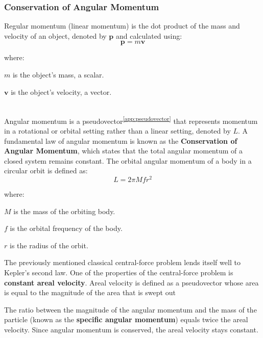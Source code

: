 \documentclass[12pt]{article}
\newcommand{\sref}[1]{\textsuperscript{\ref{#1}}}
\begin{document}
\begin{spacing}{1.25}
\subsubsection{Conservation of Angular Momentum}
\par {
    Regular momentum (linear momentum) is the dot product of the mass and velocity of an object, denoted by \(\mathbf{p}\) and calculated using:
    \begin{equation*}
        \mathbf{p} = m\mathbf{v}
    \end{equation*}
    
    \noindent where:
    \begin{slist}
        \item \(m\) is the object's mass, a scalar.
        \item \(\mathbf{v}\) is the object's velocity, a vector.
    \end{slist}
    
    \hfill \\
    Angular momentum is a pseudovector\sref{app:pseudovector} that represents momentum in a rotational or orbital setting rather than a linear setting, denoted by \(L\). A fundamental law of angular momentum is known as the \textbf{Conservation of Angular Momentum}, which states that the total angular momentum of a closed system remains constant. The orbital angular momentum of a body in a circular orbit is defined as:
    \begin{equation}
        L = 2\pi Mfr^2
    \end{equation}

    \noindent where:
    \begin{slist}
        \item \(M\) is the mass of the orbiting body.
        \item \(f\) is the orbital frequency of the body.
        \item \(r\) is the radius of the orbit.
    \end{slist}
}
\hfill 
\par {
    The previously mentioned classical central-force problem lends itself well to Kepler's second law. One of the properties of the central-force problem is \textbf{constant areal velocity}. Areal velocity is defined as a pseudovector whose area is equal to the magnitude of the area that is swept out
    
    The ratio between the magnitude of the angular momentum and the mass of the particle (known as the \textbf{specific angular momentum}) equals twice the areal velocity. Since angular momentum is conserved, the areal velocity stays constant.
}



\end{spacing}
\end{document}
